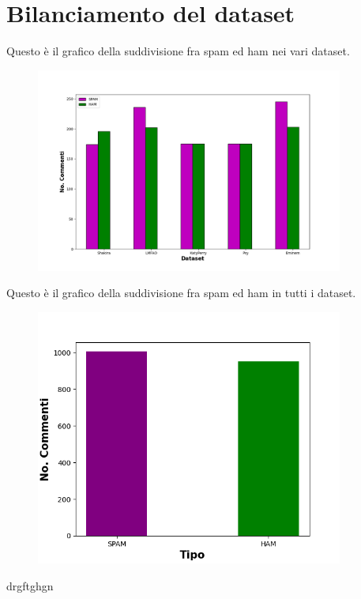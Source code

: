 \documentclass{report}
\begin{document}
    \section{Bilanciamento del dataset}
    Questo è il grafico della suddivisione fra spam ed ham nei vari dataset.
    \begin{figure}
        \centering
        \includegraphics[width = 0.9\textwidth]{immagini/DatasetSeparati.png}
    \end{figure}

    Questo è il grafico della suddivisione fra spam ed ham in tutti i dataset.

    \begin{figure}[h]
        \centering
        \includegraphics[width = 0.9\textwidth]{immagini/DatasetUnico.png}
    \end{figure}


    drgftghgn
\end{document}
